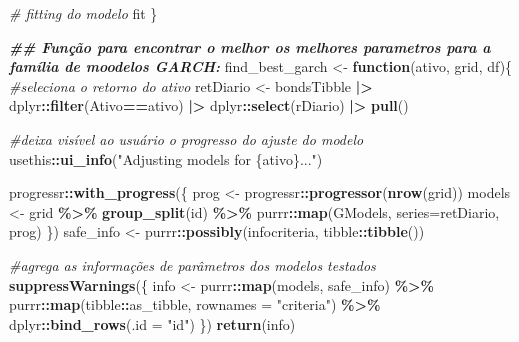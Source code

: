 \documentclass[
]{article}
\newenvironment{Shaded}{\begin{snugshade}}{\end{snugshade}}
\newcommand{\AttributeTok}[1]{\textcolor[rgb]{0.13,0.29,0.53}{#1}}
\newcommand{\CommentTok}[1]{\textcolor[rgb]{0.56,0.35,0.01}{\textit{#1}}}
\newcommand{\ControlFlowTok}[1]{\textcolor[rgb]{0.13,0.29,0.53}{\textbf{#1}}}
\newcommand{\DocumentationTok}[1]{\textcolor[rgb]{0.56,0.35,0.01}{\textbf{\textit{#1}}}}
\newcommand{\FunctionTok}[1]{\textcolor[rgb]{0.13,0.29,0.53}{\textbf{#1}}}
\newcommand{\NormalTok}[1]{#1}
\newcommand{\OtherTok}[1]{\textcolor[rgb]{0.56,0.35,0.01}{#1}}
\newcommand{\SpecialCharTok}[1]{\textcolor[rgb]{0.81,0.36,0.00}{\textbf{#1}}}
\newcommand{\StringTok}[1]{\textcolor[rgb]{0.31,0.60,0.02}{#1}}
\begin{document}
\begin{Shaded}
\begin{Highlighting}[]
  
  \CommentTok{\# fitting do modelo}
\NormalTok{  fit}
\NormalTok{\}}


\DocumentationTok{\#\# Função para encontrar o melhor os melhores parametros para a família de moodelos GARCH:}
\NormalTok{find\_best\_garch }\OtherTok{\textless{}{-}} \ControlFlowTok{function}\NormalTok{(ativo, grid, df)\{}
  \CommentTok{\#seleciona o retorno do ativo}
\NormalTok{  retDiario }\OtherTok{\textless{}{-}}\NormalTok{ bondsTibble }\SpecialCharTok{|\textgreater{}}\NormalTok{ dplyr}\SpecialCharTok{::}\FunctionTok{filter}\NormalTok{(Ativo}\SpecialCharTok{==}\NormalTok{ativo) }\SpecialCharTok{|\textgreater{}}\NormalTok{ dplyr}\SpecialCharTok{::}\FunctionTok{select}\NormalTok{(rDiario) }\SpecialCharTok{|\textgreater{}} \FunctionTok{pull}\NormalTok{()}
  
  \CommentTok{\#deixa visível ao usuário o progresso do ajuste do modelo}
\NormalTok{  usethis}\SpecialCharTok{::}\FunctionTok{ui\_info}\NormalTok{(}\StringTok{"Adjusting models for \{ativo\}..."}\NormalTok{)}

\NormalTok{  progressr}\SpecialCharTok{::}\FunctionTok{with\_progress}\NormalTok{(\{}
\NormalTok{    prog }\OtherTok{\textless{}{-}}\NormalTok{ progressr}\SpecialCharTok{::}\FunctionTok{progressor}\NormalTok{(}\FunctionTok{nrow}\NormalTok{(grid))}
\NormalTok{    models }\OtherTok{\textless{}{-}}\NormalTok{ grid }\SpecialCharTok{\%\textgreater{}\%}
      \FunctionTok{group\_split}\NormalTok{(id) }\SpecialCharTok{\%\textgreater{}\%}
\NormalTok{      purrr}\SpecialCharTok{::}\FunctionTok{map}\NormalTok{(GModels, }\AttributeTok{series=}\NormalTok{retDiario, prog)}
\NormalTok{  \})}
\NormalTok{  safe\_info }\OtherTok{\textless{}{-}}\NormalTok{ purrr}\SpecialCharTok{::}\FunctionTok{possibly}\NormalTok{(infocriteria, tibble}\SpecialCharTok{::}\FunctionTok{tibble}\NormalTok{())}
  
  \CommentTok{\#agrega as informações de parâmetros dos modelos testados}
  \FunctionTok{suppressWarnings}\NormalTok{(\{}
\NormalTok{    info }\OtherTok{\textless{}{-}}\NormalTok{ purrr}\SpecialCharTok{::}\FunctionTok{map}\NormalTok{(models, safe\_info) }\SpecialCharTok{\%\textgreater{}\%}
\NormalTok{      purrr}\SpecialCharTok{::}\FunctionTok{map}\NormalTok{(tibble}\SpecialCharTok{::}\NormalTok{as\_tibble, }\AttributeTok{rownames =} \StringTok{"criteria"}\NormalTok{) }\SpecialCharTok{\%\textgreater{}\%}
\NormalTok{      dplyr}\SpecialCharTok{::}\FunctionTok{bind\_rows}\NormalTok{(}\AttributeTok{.id =} \StringTok{"id"}\NormalTok{)}
\NormalTok{  \})}
  \FunctionTok{return}\NormalTok{(info)}
  

\end{Highlighting}
\end{Shaded}
\end{document}

